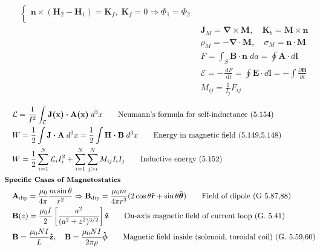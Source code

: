 \documentclass[10pt]{article}
\newcommand{\rhat}{\boldsymbol{\hat{\textbf{r}}}}
\newcommand{\zhat}{\boldsymbol{\hat{\textbf{z}}}}
\newcommand{\phihat}{\boldsymbol{\hat{\textbf{$\phi$}}}}
\newcommand{\thetahat}{\boldsymbol{\hat{\textbf{$\theta$}}}}
\newcommand{\ve}[1]{\boldsymbol{\mathbf{#1}}}
\newcommand{\vect}[1]{\boldsymbol{\mathbf{#1}}}
\newcommand{\dd}{\, \mathrm{d}}
\newcommand{\tder}[2]{\frac{\dd #1}{\dd #2}}
\newcommand{\pder}[2]{\frac{\partial #1}{\partial #2}}
\newcommand{\lrb}[1]{\left[ #1 \right]}
\begin{document}
\begin{multicols}{2}
\begin{align*}
\begin{cases}
			\vect{n} \times (\vect{H}_2 - \vect{H}_1) = \vect{K}_f, \; \ve{K}_f = 0 \Rightarrow \Phi_1 = \Phi_2 \\
		\end{cases} \tag*{Magnetic JC's (eval. at boundary) (5.86)} \\
		& \vect{J}_M = \vect{\nabla \times M}, \quad \vect{K}_b = \vect{M \times n}  \tag*{Bound current density (G. 6.13,14)} \\
		& \rho_M = - \vect{\nabla \cdot M}, \quad \sigma_M = \vect{n \cdot M} \tag*{Effective magnetic charge density (5.96,99)} \\
		& F = \int_S \vect{B \cdot n} \; da = \oint \ve{A} \cdot d \ve{l} \tag*{Magnetic flux (5.133)} \\
		& \mathscr{E} = -\tder{F}{t} = \oint \ve{E} \cdot d\ve{l} = -\int \pder{\ve{B}}{t} \tag*{EMF due to Faraday's Law (5.135)} \\
		& M_{ij} = \frac{1}{I_j} F_{ij} \tag*{Mutual inductance (5.156)} \\
	\end{align*}
	\setlength{\abovedisplayskip}{-25pt}
	\setlength{\belowdisplayskip}{0pt}
	\setlength{\abovedisplayshortskip}{0pt}
	\setlength{\belowdisplayshortskip}{0pt}
	\begin{align*} 
		& \mathcal{L} = \frac{1}{I^2} \int_\mathcal{C} \ve{J(x) \cdot A(x)} \; d^3 x \tag*{Neumann's formula for self-inductance (5.154)} \\
		& W = \frac{1}{2} \int \vect{J \cdot A} \; d^3 x  = \frac{1}{2} \int \vect{H \cdot B} \; d^3 x \tag*{Energy in magnetic field (5.149,5.148)} \\
		& W = \frac{1}{2} \sum_{i=1}^N \mathcal{L}_i I_i^2 + \sum_{i=1}^N \sum_{j>i}^N M_{ij} I_i I_j \tag*{Inductive energy (5.152)} \\
	& \small \hspace{-10pt} \textbf{Specific Cases of Magnetostatics} \small \\
		&\ve{A}_{\text{dip}} = \frac{\mu_0}{4 \pi} \frac{m \sin \theta}{r^2} \Rightarrow \ve{B}_{\text{dip}} = \frac{\mu_0 m}{4 \pi r^3}(2 \cos \theta \rhat + \sin \theta \thetahat) \tag*{Field of dipole (G 5.87,88)} \\
		& \ve{B}(z) = \frac{\mu_0 I}{2} \lrb{ \frac{a^2}{(a^2 + z^2)^{3/2}} }\zhat \tag*{On-axis magnetic field of current loop (G. 5.41)} \\
		& \ve{B} = \frac{\mu_0 N I}{L} \zhat, \quad \ve{B} = \frac{\mu_0 N I}{2 \pi \rho} \phihat \tag*{Magnetic field inside (solenoid, toroidal coil) (G. 5.59,60)} \\

\end{align*}
\end{multicols}
\end{document}
